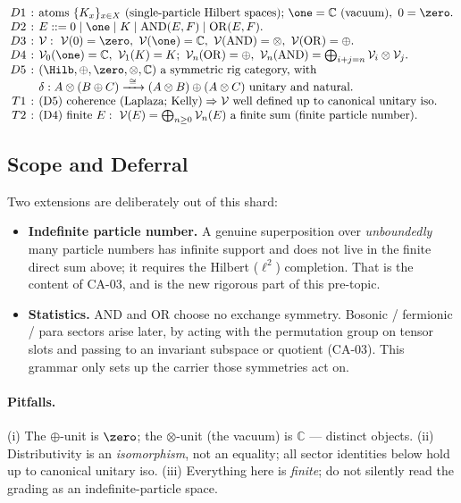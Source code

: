 {\small
\[
\setlength{\arraycolsep}{2pt}
\begin{array}{rcl}
D1 &:& \text{atoms } \{K_x\}_{x\in X}\ \text{(single-particle Hilbert spaces);}\
       \one=\mathbb C\ \text{(vacuum)},\ 0=\zero.\\
D2 &:& E ::= 0 \mid \one \mid K \mid \mathrm{AND}(E,F)\mid \mathrm{OR}(E,F).\\
D3 &:& \mathcal V:\ \mathcal V(0)=\zero,\ \mathcal V(\one)=\mathbb C,\
       \mathcal V(\mathrm{AND})=\otimes,\ \mathcal V(\mathrm{OR})=\oplus.\\
D4 &:& \mathcal V_0(\one)=\mathbb C,\ \mathcal V_1(K)=K;\
       \mathcal V_n(\mathrm{OR})=\oplus,\ \mathcal V_n(\mathrm{AND})=\textstyle\bigoplus_{i+j=n}\mathcal V_i\otimes\mathcal V_j.\\
D5 &:& (\Hilb,\oplus,\zero,\otimes,\mathbb C)\ \text{a symmetric rig category, with}\\
   & & \delta:A\otimes(B\oplus C)\xrightarrow{\ \cong\ }(A\otimes B)\oplus(A\otimes C)\ \text{unitary and natural.}\\
T1 &:& \text{(D5) coherence (Laplaza; Kelly)}\Rightarrow \mathcal V\ \text{well defined up to canonical unitary iso.}\\
T2 &:& \text{(D4) finite }E:\ \mathcal V(E)=\bigoplus_{n\ge0}\mathcal V_n(E)\ \text{a finite sum (finite particle number).}\\
\end{array}
\]
}

\subsection{Scope and Deferral}

Two extensions are deliberately out of this shard:
\begin{itemize}
  \item \textbf{Indefinite particle number.} A genuine superposition over
  \emph{unboundedly} many particle numbers has infinite support and does not live
  in the finite direct sum above; it requires the Hilbert ($\ell^2$) completion.
  That is the content of CA-03, and is the new rigorous part of this pre-topic.
  \item \textbf{Statistics.} $\mathrm{AND}$ and $\mathrm{OR}$ choose no exchange
  symmetry. Bosonic / fermionic / para sectors arise later, by acting with the
  permutation group on tensor slots and passing to an invariant subspace or
  quotient (CA-03). This grammar only sets up the carrier those symmetries act on.
\end{itemize}

\paragraph{Pitfalls.}
(i) The $\oplus$-unit is $\zero$; the $\otimes$-unit (the vacuum) is $\mathbb C$ ---
distinct objects. (ii) Distributivity is an \emph{isomorphism}, not an equality;
all sector identities below hold up to canonical unitary iso. (iii) Everything here
is \emph{finite}; do not silently read the grading as an indefinite-particle space.
